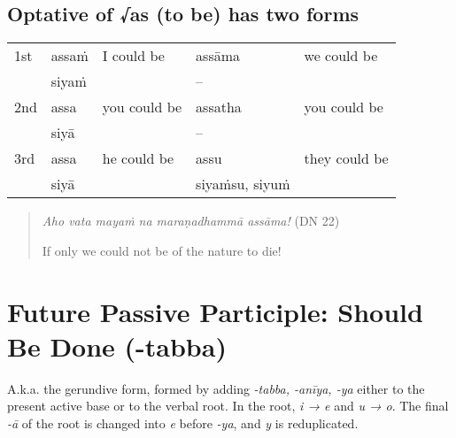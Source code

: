 \documentclass[11pt,oneside]{memoir}
\begin{document}
\subsection{Optative of √as (to be) has two forms}
\label{sec:org9bcb25c}

\begin{center}
\begin{tabular}{lllll}
1st & assaṁ & I could be & assāma & we could be\\[0pt]
 & siyaṁ &  & -- & \\[0pt]
\hline
2nd & assa & you could be & assatha & you could be\\[0pt]
 & siyā &  & -- & \\[0pt]
\hline
3rd & assa & he could be & assu & they could be\\[0pt]
 & siyā &  & siyaṁsu, siyuṁ & \\[0pt]
\end{tabular}
\end{center}

\begin{quote}
\emph{Aho vata mayaṁ na maraṇadhammā assāma!} (DN 22)

If only we could not be of the nature to die!
\end{quote}

\section{Future Passive Participle: Should Be Done (-tabba)}
\label{sec:orgb0e63f3}

A.k.a. the gerundive form, formed by adding \emph{-tabba, -anīya, -ya} either to the
present active base or to the verbal root. In the root, \emph{i → e} and \emph{u → o}.
The final \emph{-ā} of the root is changed into \emph{e} before \emph{-ya}, and \emph{y} is reduplicated.
\end{document}

